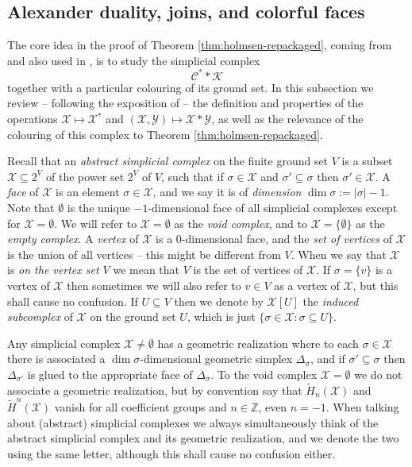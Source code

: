 \documentclass[a4paper,11pt,reqno, english]{amsart}
\theoremstyle{definition}
\theoremstyle{remark}
\newcommand\Z{\mathbb Z}
\begin{document}
\medskip
\subsection{Alexander duality, joins, and colorful faces}\label{sec:the-method:sc-tools}
\medskip

The core idea in the proof of Theorem \ref{thm:holmsen-repackaged}, coming from \cite{KalaiMeshulam2005} and also used in \cite{Holmsen2016}, is to study the simplicial complex
\[
    \mathscr{C}^**\mathscr{K}
\]
together with a particular colouring of its ground set. In this subsection we review -- following the exposition of \cite[Sections 3.1, 3.2]{Holmsen2016} -- the definition and properties of the operations $\mathscr{X}\mapsto\mathscr{X}^*$ and $(\mathscr{X},\mathscr{Y})\mapsto\mathscr{X}*\mathscr{Y}$, as well as the relevance of the colouring of this complex to Theorem \ref{thm:holmsen-repackaged}.

Recall that an \emph{abstract simplicial complex} on the finite ground set $V$ is a subset $\mathscr{X}\subseteq 2^V$ of the power set $2^V$ of $V$, such that if $\sigma\in \mathscr{X}$ and $\sigma'\subseteq\sigma$ then $\sigma'\in \mathscr{X}$. A \emph{face} of $\mathscr{X}$ is an element $\sigma\in \mathscr{X}$, and we say it is of \emph{dimension} $\dim\sigma:=|\sigma|-1$. Note that $\emptyset$ is the unique $-1$-dimensional face of all simplicial complexes except for $\mathscr{X}=\emptyset$. We will refer to $\mathscr{X}=\emptyset$ as the \emph{void complex}, and to $\mathscr{X}=\{\emptyset\}$ as the \emph{empty complex}. A \emph{vertex} of $\mathscr{X}$ is a $0$-dimensional face, and the \emph{set of vertices} of $\mathscr{X}$ is the union of all vertices -- this might be different from $V$. When we say that $\mathscr{X}$ is \emph{on the vertex set $V$} we mean that $V$ is the set of vertices of $\mathscr{X}$. If $\sigma=\{v\}$ is a vertex of $\mathscr{X}$ then sometimes we will also refer to $v\in V$ as a vertex of $\mathscr{X}$, but this shall cause no confusion. If $U\subseteq V$ then we denote by $\mathscr{X}[U]$ the \emph{induced subcomplex} of $\mathscr{X}$ on the ground set $U$, which is just $\{\sigma\in \mathscr{X}:\sigma\subseteq U\}$.

Any simplicial complex $\mathscr{X}\neq\emptyset$ has a geometric realization where to each $\sigma\in \mathscr{X}$ there is associated a $\dim\sigma$-dimensional geometric simplex $\Delta_\sigma$, and if $\sigma'\subseteq\sigma$ then $\Delta_{\sigma'}$ is glued to the appropriate face of $\Delta_\sigma$. To the void complex $\mathscr{X}=\emptyset$ we do not associate a geometric realization, but by convention say that $\tilde{H}_n(\mathscr{X})$ and $\tilde{H}^n(\mathscr{X})$ vanish for all coefficient groups and $n\in\Z$, even $n=-1$. When talking about (abstract) simplicial complexes we always simultaneously think of the abstract simplicial complex and its geometric realization, and we denote the two using the same letter, although this shall cause no confusion either.
\end{document}
